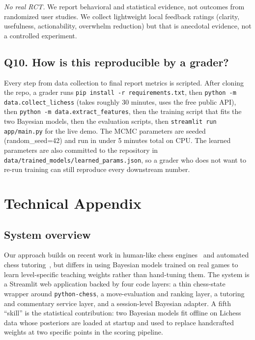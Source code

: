 \documentclass[11pt]{article}
\begin{document}
\emph{No real RCT.} We report behavioral and statistical evidence, not outcomes from randomized user studies. We collect lightweight local feedback ratings (clarity, usefulness, actionability, overwhelm reduction) but that is anecdotal evidence, not a controlled experiment.

\subsection*{Q10. How is this reproducible by a grader?}
Every step from data collection to final report metrics is scripted. After cloning the repo, a grader runs \texttt{pip install -r requirements.txt}, then \texttt{python -m data.collect\_lichess} (takes roughly 30 minutes, uses the free public API), then \texttt{python -m data.extract\_features}, then the training script that fits the two Bayesian models, then the evaluation scripts, then \texttt{streamlit run app/main.py} for the live demo. The MCMC parameters are seeded (random\_seed=42) and run in under 5 minutes total on CPU. The learned parameters are also committed to the repository in \texttt{data/trained\_models/learned\_params.json}, so a grader who does not want to re-run training can still reproduce every downstream number.

\newpage

\section{Technical Appendix}

\subsection{System overview}
Our approach builds on recent work in human-like chess engines~\cite{mcilroy2020aligning} and automated chess tutoring~\cite{sadikov2006automated}, but differs in using Bayesian models trained on real games to learn level-specific teaching weights rather than hand-tuning them. The system is a Streamlit web application backed by four code layers: a thin chess-state wrapper around \texttt{python-chess}, a move-evaluation and ranking layer, a tutoring and commentary service layer, and a session-level Bayesian adapter. A fifth ``skill'' is the statistical contribution: two Bayesian models fit offline on Lichess data whose posteriors are loaded at startup and used to replace handcrafted weights at two specific points in the scoring pipeline.
\end{document}
